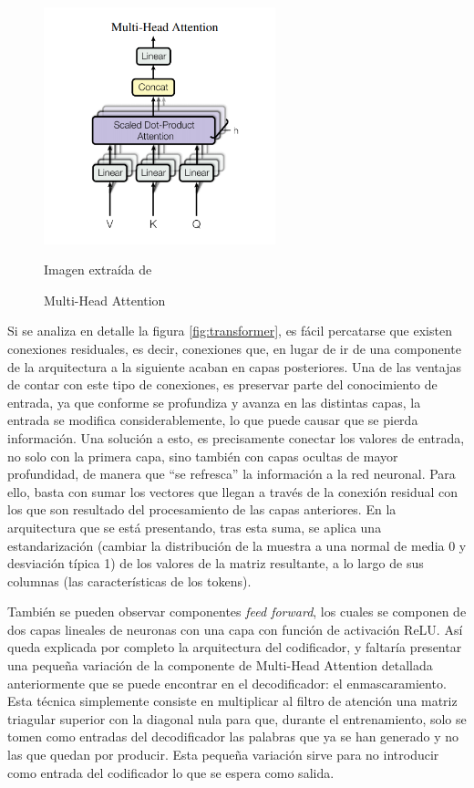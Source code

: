 \begin{figure}[h]
	\centering%
	\centerline{\includegraphics[width = 0.6\textwidth]{Imagenes/Bitmap/multi-head-attention.png}}%
	\caption{Multi-Head Attention}%
	Imagen extraída de \cite{transformers}
	\label{fig:multiattention}
\end{figure}

Si se analiza en detalle la figura \ref{fig:transformer}, es fácil percatarse que existen conexiones residuales, es decir, conexiones que, en lugar de ir de una componente de la arquitectura a la siguiente acaban en capas posteriores. Una de las ventajas de contar con este tipo de conexiones, es preservar parte del conocimiento de entrada, ya que conforme se profundiza y avanza en las distintas capas, la entrada se modifica considerablemente, lo que puede causar que se pierda información. Una solución a esto, es precisamente conectar los valores de entrada, no solo con la primera capa, sino también con capas ocultas de mayor profundidad, de manera que ``se refresca'' la información a la red neuronal. Para ello, basta con sumar los vectores que llegan a través de la conexión residual con los que son resultado del procesamiento de las capas anteriores. En la arquitectura que se está presentando, tras esta suma, se aplica una estandarización (cambiar la distribución de la muestra a una normal de media 0 y desviación típica 1) de los valores de la matriz resultante, a lo largo de sus columnas (las características de los tokens).

También se pueden observar componentes \textit{feed forward}, los cuales se componen de dos capas lineales de neuronas con una capa con función de activación ReLU. Así queda explicada por completo la arquitectura del codificador, y faltaría presentar una pequeña variación de la componente de Multi-Head Attention detallada anteriormente que se puede encontrar en el decodificador: el enmascaramiento. Esta técnica simplemente consiste en multiplicar al filtro de atención una matriz triagular superior con la diagonal nula para que, durante el entrenamiento, solo se tomen como entradas del decodificador las palabras que ya se han generado y no las que quedan por producir. Esta pequeña variación sirve para no introducir como entrada del codificador lo que se espera como salida.

